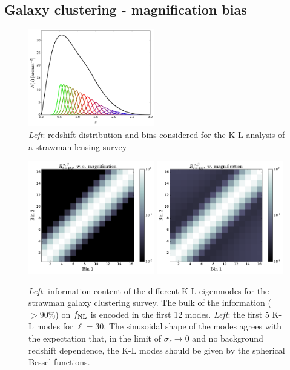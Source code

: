 \documentclass[twocolumn,amsfont,amssymb,amsmath, showpacs,balancelastpage, nofootinbib]{revtex4-1}
\begin{document}
  \subsection{Galaxy clustering - magnification bias}\label{ssec:results.mag}  
    \begin{figure}
      \centering
      \includegraphics[width=0.49\textwidth]{Figs/nz_lsst_wl}
      \caption{{\sl Left}: redshift distribution and bins considered for the K-L analysis of a strawman lensing survey}\label{fig:nz_mb}
    \end{figure}
    \begin{figure}
      \centering
      \includegraphics[width=0.49\textwidth]{Figs/r_ij_mb_wom}
      \includegraphics[width=0.49\textwidth]{Figs/r_ij_mb_wm}
      \caption{{\sl Left}: information content of the different K-L eigenmodes for the strawman galaxy clustering survey. The bulk of the information ($>90\%$) on $f_{\rm NL}$ is encoded in the first 12 modes. {\sl Left}: the first 5 K-L modes for $\ell=30$. The sinusoidal shape of the modes agrees with the expectation that, in the limit of $\sigma_z\rightarrow0$ and no background redshift dependence, the K-L modes should be given by the spherical Bessel functions. }\label{fig:r_ij_wm}
    \end{figure}
\end{document}
